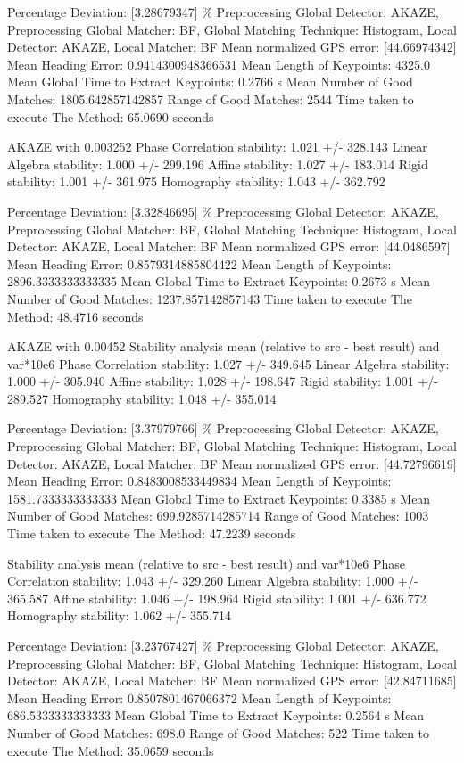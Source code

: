 \begin{itemize}
Percentage Deviation: [3.28679347] \%
Preprocessing Global Detector: AKAZE, Preprocessing Global Matcher: BF, Global Matching Technique: Histogram, Local Detector: AKAZE, Local Matcher: BF
Mean normalized GPS error: [44.66974342]
 Mean Heading Error: 0.9414300948366531
Mean Length of Keypoints: 4325.0
Mean Global Time to Extract Keypoints: 0.2766 s
Mean Number of Good Matches: 1805.642857142857
Range of Good Matches: 2544
Time taken to execute The Method: 65.0690 seconds


AKAZE with 0.003252
Phase Correlation stability: 1.021 +/- 328.143
Linear Algebra stability: 1.000 +/- 299.196
Affine stability: 1.027 +/- 183.014
Rigid stability: 1.001 +/- 361.975
Homography stability: 1.043 +/- 362.792

Percentage Deviation: [3.32846695] \%
Preprocessing Global Detector: AKAZE, Preprocessing Global Matcher: BF, Global Matching Technique: Histogram, Local Detector: AKAZE, Local Matcher: BF
Mean normalized GPS error: [44.0486597]
 Mean Heading Error: 0.8579314885804422
Mean Length of Keypoints: 2896.3333333333335
Mean Global Time to Extract Keypoints: 0.2673 s
Mean Number of Good Matches: 1237.857142857143
Time taken to execute The Method: 48.4716 seconds




AKAZE with 0.00452
Stability analysis mean (relative to src - best result) and var*10e6
Phase Correlation stability: 1.027 +/- 349.645
Linear Algebra stability: 1.000 +/- 305.940
Affine stability: 1.028 +/- 198.647
Rigid stability: 1.001 +/- 289.527
Homography stability: 1.048 +/- 355.014

Percentage Deviation: [3.37979766] \%
Preprocessing Global Detector: AKAZE, Preprocessing Global Matcher: BF, Global Matching Technique: Histogram, Local Detector: AKAZE, Local Matcher: BF
Mean normalized GPS error: [44.72796619]
 Mean Heading Error: 0.8483008533449834
Mean Length of Keypoints: 1581.7333333333333
Mean Global Time to Extract Keypoints: 0.3385 s
Mean Number of Good Matches: 699.9285714285714
Range of Good Matches: 1003
Time taken to execute The Method: 47.2239 seconds


Stability analysis mean (relative to src - best result) and var*10e6
Phase Correlation stability: 1.043 +/- 329.260
Linear Algebra stability: 1.000 +/- 365.587
Affine stability: 1.046 +/- 198.964
Rigid stability: 1.001 +/- 636.772
Homography stability: 1.062 +/- 355.714

Percentage Deviation: [3.23767427] \%
Preprocessing Global Detector: AKAZE, Preprocessing Global Matcher: BF, Global Matching Technique: Histogram, Local Detector: AKAZE, Local Matcher: BF
Mean normalized GPS error: [42.84711685]
 Mean Heading Error: 0.8507801467066372
Mean Length of Keypoints: 686.5333333333333
Mean Global Time to Extract Keypoints: 0.2564 s
Mean Number of Good Matches: 698.0
Range of Good Matches: 522
Time taken to execute The Method: 35.0659 seconds




\end{itemize}
